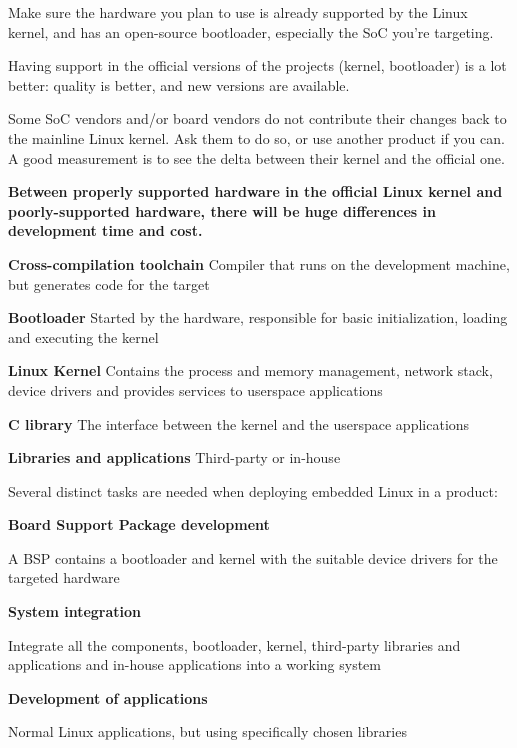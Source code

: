 \startitemize
\item Make sure the hardware you plan to use is already supported by
  the Linux kernel, and has an open-source bootloader, especially
  the SoC you’re targeting.
\item Having support in the official versions of the projects
  (kernel, bootloader) is a lot better: quality is better, and new
  versions are available.
\item Some SoC vendors and/or board vendors do not contribute their
  changes back to the mainline Linux kernel. Ask them to do so, or
  use another product if you can. A good measurement is to see the
  delta between their kernel and the official one.
\item {\bf Between properly supported hardware in the official Linux
  kernel and poorly-supported hardware, there will be huge
  differences in development time and cost.}
\stopitemize




  \startitemize
  \item {\bf Cross-compilation toolchain}
    Compiler that runs on the development machine, but generates
    code for the target
  \item {\bf Bootloader}
    Started by the hardware, responsible for basic
      initialization, loading and executing the kernel
  \item {\bf Linux Kernel}
    Contains the process and memory management, network stack,
      device drivers and provides services to userspace applications
  \item {\bf C library}
    The interface between the kernel and the userspace
      applications
  \item {\bf Libraries and applications}
     Third-party or in-house
  \stopitemize


  Several distinct tasks are needed when deploying embedded Linux in a
  product:

  \startitemize
  \item {\bf Board Support Package development}
    \startitemize
    \item A BSP contains a bootloader and kernel with the suitable
      device drivers for the targeted hardware
    \stopitemize
  \item {\bf System integration}
    \startitemize
    \item Integrate all the components, bootloader, kernel,
      third-party libraries and applications and in-house applications
      into a working system
    \stopitemize
  \item {\bf Development of applications}
    \startitemize
    \item Normal Linux applications, but using specifically chosen
      libraries
    \stopitemize
  \stopitemize

